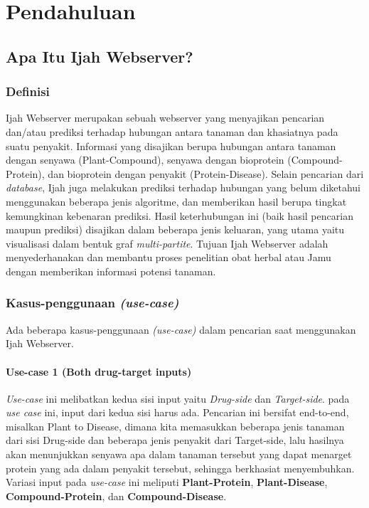 \chapter{Pendahuluan}

\section{Apa Itu Ijah Webserver?}

	\subsection{Definisi}
	Ijah Webserver merupakan sebuah webserver yang menyajikan pencarian dan/atau prediksi terhadap hubungan antara tanaman dan khasiatnya pada suatu penyakit. Informasi yang disajikan berupa hubungan antara tanaman dengan senyawa (Plant-Compound), senyawa dengan bioprotein (Compound-Protein), dan bioprotein dengan penyakit (Protein-Disease). Selain pencarian dari \emph{database}, Ijah juga melakukan prediksi terhadap hubungan yang belum diketahui menggunakan beberapa jenis algoritme, dan memberikan hasil berupa tingkat kemungkinan kebenaran prediksi. Hasil keterhubungan ini (baik hasil pencarian maupun prediksi) disajikan dalam beberapa jenis keluaran, yang utama yaitu visualisasi dalam bentuk graf \emph{multi-partite}. Tujuan Ijah Webserver adalah menyederhanakan dan membantu proses penelitian obat herbal atau Jamu dengan memberikan informasi potensi tanaman.

	\subsection{Kasus-penggunaan \emph{(use-case)}}
	Ada beberapa kasus-penggunaan \emph{(use-case)} dalam pencarian saat menggunakan Ijah Webserver.
		\subsubsection{Use-case 1 (Both drug-target inputs)} \label{end to end}
		\emph{Use-case} ini melibatkan kedua sisi input yaitu \emph{Drug-side} dan \emph{Target-side}. pada \emph{use case} ini, input dari kedua sisi harus ada. Pencarian ini bersifat end-to-end, misalkan Plant to Disease, dimana kita memasukkan beberapa jenis tanaman dari sisi Drug-side dan beberapa jenis penyakit dari Target-side, lalu hasilnya akan menunjukkan senyawa apa dalam tanaman tersebut yang dapat menarget protein yang ada dalam penyakit tersebut, sehingga berkhasiat menyembuhkan. Variasi input pada \emph{use-case} ini meliputi \textbf{Plant-Protein}, \textbf{Plant-Disease}, \textbf{Compound-Protein}, dan \textbf{Compound-Disease}.
